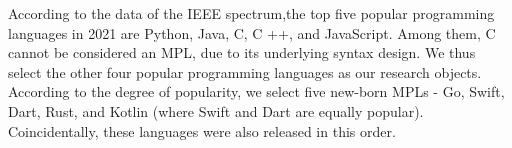 

According to the data of the IEEE spectrum,the top five popular programming
languages in 2021 are Python, Java, C, C ++, and JavaScript\cite{IEEETopProgrammingLanguages}.
Among them, C cannot be considered an MPL, due to its underlying syntax design.
We thus select the other four popular programming languages as our research objects.
According to the degree of popularity, we select five new-born MPLs -
Go, Swift, Dart, Rust, and Kotlin (where Swift and Dart are equally popular).
Coincidentally, these languages were also released in this order.





